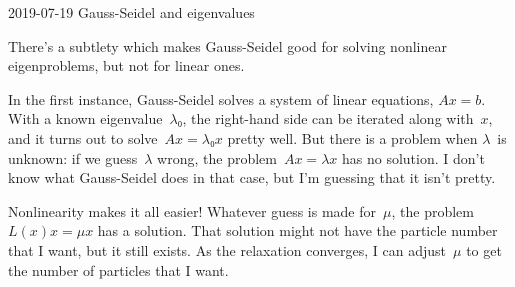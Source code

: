 2019-07-19 Gauss-Seidel and eigenvalues

There's a subtlety which makes Gauss-Seidel good for solving nonlinear eigenproblems, but not for linear ones.

In the first instance, Gauss-Seidel solves a system of linear equations, $Ax=b$.  With a known eigenvalue~$λ₀$, the right-hand side can be iterated along with~$x$, and it turns out to solve~$Ax=λ₀x$ pretty well.  But there is a problem when $λ$~is unknown: if we guess~$λ$ wrong, the problem~$Ax=λx$ has no solution.  I don't know what Gauss-Seidel does in that case, but I'm guessing that it isn't pretty.

Nonlinearity makes it all easier!  Whatever guess is made for~$μ$, the problem~$L(x)x=μx$ has a solution.  That solution might not have the particle number that I want, but it still exists.  As the relaxation converges, I can adjust~$μ$ to get the number of particles that I want.

\bye